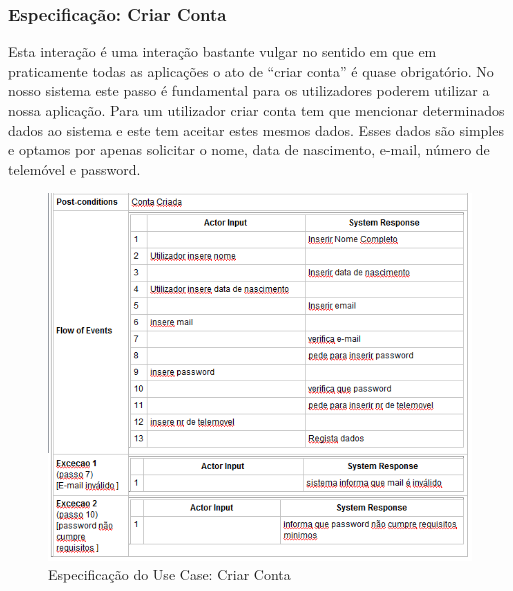 \newpage

\subsubsection{Especificação: Criar Conta }
Esta interação é uma interação bastante vulgar no sentido em que em praticamente todas as aplicações o ato de “criar conta” é quase obrigatório.  No nosso sistema este passo é fundamental para os utilizadores poderem utilizar a nossa aplicação. Para um utilizador criar conta tem que mencionar determinados dados ao sistema e este tem aceitar estes mesmos dados. Esses dados são simples e optamos por apenas solicitar o nome, data de nascimento, e-mail, número de telemóvel e password.

\begin{figure}[htb!]
	\centering
	\includegraphics[scale=0.6]{imagens/Especificacoes/criarconta}  
	\caption{Especificação do Use Case: Criar Conta   }  
\end{figure}


